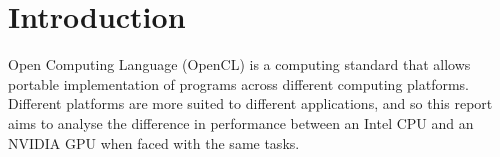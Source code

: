 \section{Introduction}
Open Computing Language (OpenCL) is a computing standard that allows portable implementation of programs across different computing platforms. Different platforms are more suited to different applications, and so this report aims to analyse the difference in performance between an Intel CPU and an NVIDIA GPU when faced with the same tasks.